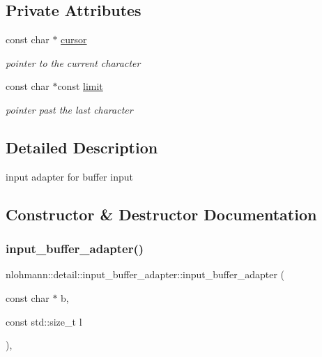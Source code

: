 \subsection*{Private Attributes}
\begin{DoxyCompactItemize}
\item 
const char $\ast$ \hyperlink{classnlohmann_1_1detail_1_1input__buffer__adapter_a49e6c8b6555af489a45ef51737eafa1c}{cursor}
\begin{DoxyCompactList}\small\item\em pointer to the current character \end{DoxyCompactList}\item 
const char $\ast$const \hyperlink{classnlohmann_1_1detail_1_1input__buffer__adapter_abbea9cdb1862e55bc1e142a72a947da4}{limit}
\begin{DoxyCompactList}\small\item\em pointer past the last character \end{DoxyCompactList}\end{DoxyCompactItemize}


\subsection{Detailed Description}
input adapter for buffer input 

\subsection{Constructor \& Destructor Documentation}
\mbox{\label{classnlohmann_1_1detail_1_1input__buffer__adapter_ad9b912fabdcb53de255e8c444d625ac3}} 
\subsubsection{\texorpdfstring{input\+\_\+buffer\+\_\+adapter()}{input\_buffer\_adapter()}\hspace{0.1cm}{\footnotesize\ttfamily [1/3]}}
{\footnotesize\ttfamily nlohmann\+::detail\+::input\+\_\+buffer\+\_\+adapter\+::input\+\_\+buffer\+\_\+adapter (\begin{DoxyParamCaption}\item[{const char $\ast$}]{b,  }\item[{const std\+::size\+\_\+t}]{l }\end{DoxyParamCaption})\hspace{0.3cm}{\ttfamily [inline]}, {\ttfamily [noexcept]}}

